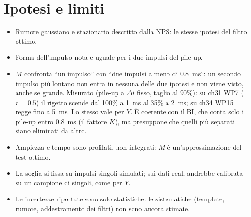 \documentclass[11pt,a4paper]{article}
\newcommand{\dt}{\Delta t}
\begin{document}
\section{Ipotesi e limiti}
\begin{itemize}
  \item Rumore gaussiano e stazionario descritto dalla NPS: le stesse ipotesi del filtro ottimo.
  \item Forma dell'impulso nota e uguale per i due impulsi del pile-up.
  \item $M$ confronta ``un impulso'' con ``due impulsi a meno di 0.8~ms'': un secondo impulso più
    lontano non entra in nessuna delle due ipotesi e non viene visto, anche se grande. Misurato
    (pile-up a $\dt$ fisso, taglio al 90\%): su ch31 WP7 ($r = 0.5$) il rigetto scende dal 100\% a
    1~ms al 35\% a 2~ms; su ch34 WP15 regge fino a 5~ms. Lo stesso vale per $Y$. È coerente con il
    BI, che conta solo i pile-up entro 0.8~ms (il fattore $K$), ma presuppone che quelli più
    separati siano eliminati da altro.
  \item Ampiezza e tempo sono profilati, non integrati: $M$ è un'approssimazione del test ottimo.
  \item La soglia si fissa su impulsi singoli simulati; sui dati reali andrebbe calibrata su un
    campione di singoli, come per $Y$.
  \item Le incertezze riportate sono solo statistiche: le sistematiche (template, rumore,
    addestramento dei filtri) non sono ancora stimate.
\end{itemize}

\end{document}
